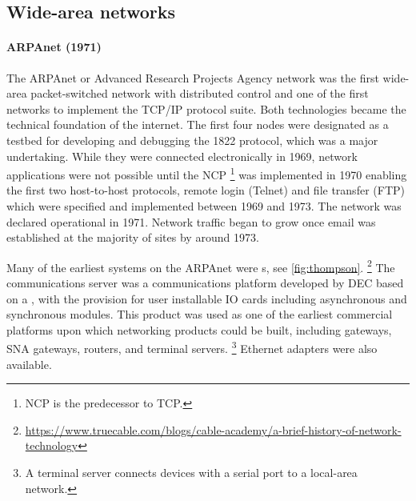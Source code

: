 {\subsection{Wide-area networks}
\label{sec:network-evoluation-wan}

\paragraph{ARPAnet (1971)}%
The ARPAnet or Advanced Research Projects Agency network was the first wide-area packet-switched network with distributed control and one of the first networks to implement the \acs{TCP}/\acs{IP} protocol suite.
Both technologies became the technical foundation of the internet.
The first four nodes were designated as a testbed for developing and debugging the 1822 protocol, which was a major undertaking.
While they were connected electronically in 1969, network applications were not possible until the \gls{NCP}%
   \footnote{\acs{NCP} is the predecessor to \acs{TCP}.}
was implemented in 1970 enabling the first two host-to-host protocols, remote login (Telnet) and file transfer (\acs{FTP}) which were specified and implemented between 1969 and 1973.
The network was declared operational in 1971.
Network traffic began to grow once email was established at the majority of sites by around 1973.

Many of the earliest systems on the ARPAnet were s, see \vref{fig:thompson}.%
\footnote{\href{https://www.truecable.com/blogs/cable-academy/a-brief-history-of-network-technology}{https://www.truecable.com/blogs/cable-academy/a-brief-history-of-network-technology}}
The  communications server was a communications platform developed by \gls{DEC} based on a , with the provision for user installable \gls{IO} cards including asynchronous and synchronous modules.
This product was used as one of the earliest commercial platforms upon which networking products could be built, including  gateways, \gls{SNA} gateways, routers, and terminal servers.%
\footnote{A terminal server connects devices with a serial port to a local-area network.}
Ethernet adapters were also available.

}
